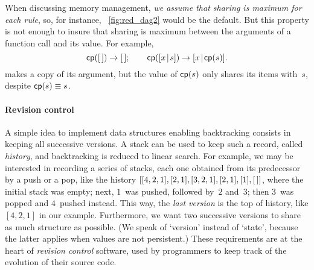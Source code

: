 When discussing memory management, \emph{we assume that sharing is
  maximum for each rule}, so, for instance, \fig~\vref{fig:red_dag2}
would be the default. But this property is not enough to insure that
sharing is maximum between the arguments of a function call and its
value. For example,
\begin{equation*}
\textsf{cp}([\,]) \rightarrow [\,];\qquad
\textsf{cp}([{x}\!\mid\!{s}]) \rightarrow [{x}\!\mid\!{\textsf{cp}(s)}].
\end{equation*}
makes a copy of its argument, but the value of \(\textsf{cp}(s)\) only
shares its items with~\(s\), despite \(\textsf{cp}(s) \equiv s\).

\paragraph{Revision control}

A simple idea to implement data structures enabling backtracking
consists in keeping all successive
versions. A stack can be used to keep
such a record, called \emph{history}, and
backtracking is reduced to linear search. For
example, we may be interested in recording a series of stacks, each
one obtained from its predecessor by a push or a pop, like the history
\([[4,2,1],[2,1],[3,2,1],[2,1],[1],[\,]]\), where the initial stack was
empty; next, \(1\)~was pushed, followed by~\(2\) and~\(3\); then
\(3\)~was popped and \(4\)~pushed instead. This way, the \emph{last
  version} is the top of history, like \([4,2,1]\) in our
example. Furthermore, we want two successive versions to share as much
structure as possible. (We speak of `version' instead of `state',
because the latter applies when values are not persistent.)  These
requirements are at the heart of \emph{revision control} software,
used by programmers to keep track of the evolution of their source
code.

